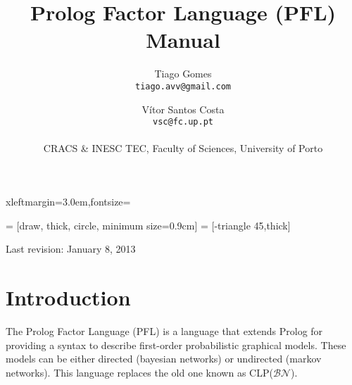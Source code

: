 \documentclass{article}
\begin{document}
 {xleftmargin=3.0em,fontsize=\small}

\newenvironment{pflcode}
  {\VerbatimEnvironment \setstretch{0.8} \begin{pflcodeve}}
  {\end{pflcodeve} }

\newcommand{\true}      {\mathtt{t}}
\newcommand{\false}     {\mathtt{f}}
\newcommand{\pathsep}   { $\triangleright$ }
\newcommand{\tableline} {\noalign{\hrule height 0.8pt}}

   = [draw, thick, circle, minimum size=0.9cm]
 = [-triangle 45,thick]

\setlength{\parskip}{\baselineskip}

\title{\Huge\textbf{Prolog Factor Language (PFL) Manual}}

\author{Tiago Gomes\\\texttt{tiago.avv@gmail.com} \and V\'{i}tor Santos Costa\\\texttt{vsc@fc.up.pt}\\\\
CRACS \& INESC TEC, Faculty of Sciences, University of Porto
}


\date{}

\maketitle
\thispagestyle{empty}
\vspace{5cm}
\begin{center}
  \large Last revision: January 8, 2013
\end{center}
\newpage



\section{Introduction}
The Prolog Factor Language (PFL) is a language that extends Prolog for providing a syntax to describe first-order probabilistic graphical models. These models can be either directed (bayesian networks) or undirected (markov networks). This language replaces the old one known as CLP($\mathcal{BN}$).
\end{document}
